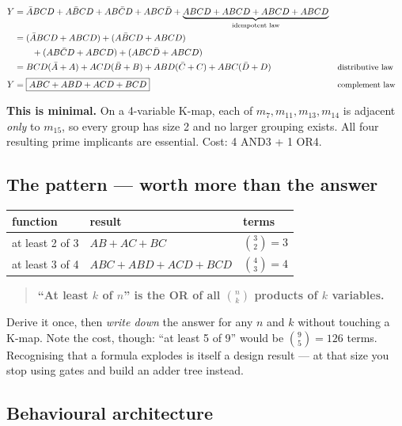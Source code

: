 \documentclass[11pt]{article}
\begin{document}
\begin{align*}
Y &= \bar{A}BCD + A\bar{B}CD + AB\bar{C}D + ABC\bar{D}
     + \underbrace{ABCD + ABCD + ABCD + ABCD}_{\text{idempotent law}} \\
  &= (\bar{A}BCD + ABCD) + (A\bar{B}CD + ABCD) \\
  &\qquad + (AB\bar{C}D + ABCD) + (ABC\bar{D} + ABCD) \\
  &= BCD(\bar{A}+A) + ACD(\bar{B}+B) + ABD(\bar{C}+C) + ABC(\bar{D}+D) && \text{\small distributive law} \\[2pt]
Y &= \boxed{ABC + ABD + ACD + BCD} && \text{\small complement law}
\end{align*}

\textbf{This is minimal.} On a 4-variable K-map, each of $m_7, m_{11}, m_{13},
m_{14}$ is adjacent \emph{only} to $m_{15}$, so every group has size 2 and no
larger grouping exists. All four resulting prime implicants are essential.
Cost: 4 AND3 + 1 OR4.

\subsection*{The pattern --- worth more than the answer}

\begin{center}
\begin{tabular}{lll}
\toprule
function & result & terms \\
\midrule
at least 2 of 3 & $AB + AC + BC$ & $\binom{3}{2} = 3$ \\
at least 3 of 4 & $ABC + ABD + ACD + BCD$ & $\binom{4}{3} = 4$ \\
\bottomrule
\end{tabular}
\end{center}

\begin{quote}
\textbf{``At least $k$ of $n$'' is the OR of all $\binom{n}{k}$ products of $k$
variables.}
\end{quote}

Derive it once, then \emph{write down} the answer for any $n$ and $k$ without
touching a K-map. Note the cost, though: ``at least 5 of 9'' would be
$\binom{9}{5} = 126$ terms. Recognising that a formula explodes is itself a design
result --- at that size you stop using gates and build an adder tree instead.

\subsection*{Behavioural architecture}
\end{document}
